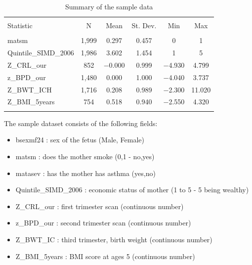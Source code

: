 \documentclass[bsc]{abdnthesis}
\begin{document}
\begin{table}[H] \centering 
  \caption{Summary of the sample data} 
  \label{abdn-summary} 
\begin{tabular}{@{\extracolsep{5pt}}lccccc} 
\\[-1.8ex]\hline 
\hline \\[-1.8ex] 
Statistic & \multicolumn{1}{c}{N} & \multicolumn{1}{c}{Mean} & \multicolumn{1}{c}{St. Dev.} & \multicolumn{1}{c}{Min} & \multicolumn{1}{c}{Max} \\ 
\hline \\[-1.8ex] 
matsm & 1,999 & 0.297 & 0.457 & 0 & 1 \\ 
Quintile\_SIMD\_2006 & 1,986 & 3.602 & 1.454 & 1 & 5 \\ 
Z\_CRL\_our & 852 & $-$0.000 & 0.999 & $-$4.930 & 4.799 \\ 
z\_BPD\_our & 1,480 & 0.000 & 1.000 & $-$4.040 & 3.737 \\ 
Z\_BWT\_ICH & 1,716 & 0.208 & 0.989 & $-$2.300 & 11.020 \\ 
Z\_BMI\_5years & 754 & 0.518 & 0.940 & $-$2.550 & 4.320 \\ 
\hline \\[-1.8ex] 
\end{tabular} 
\end{table} 

The sample dataset consists of the following fields:

\begin{itemize}
	\item bsexmf24 : sex of the fetus (Male, Female)
	\item matsm : does the mother smoke (0,1 - no,yes)
	\item matasev : has the mother has asthma (yes,no)
	\item Quintile\_SIMD\_2006 : economic status of mother (1 to 5 - 5 being wealthy)
	\item Z\_CRL\_our : first trimester scan (continuous number)
	\item z\_BPD\_our : second trimester scan (continuous number)
	\item Z\_BWT\_IC : third trimester, birth weight (continuous number)
	\item Z\_BMI\_5years : BMI score at ages 5 (continuous number)
\end{itemize}
\end{document}
